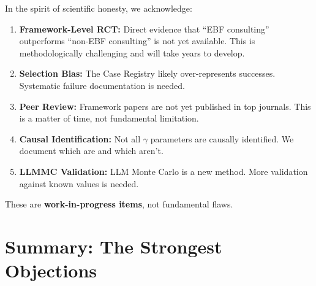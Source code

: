 \begin{tcolorbox}[colback=yellow!5!white, colframe=yellow!75!black,
    title=What We Acknowledge]

In the spirit of scientific honesty, we acknowledge:

\begin{enumerate}
    \item \textbf{Framework-Level RCT:} Direct evidence that ``EBF consulting'' outperforms
    ``non-EBF consulting'' is not yet available. This is methodologically challenging
    and will take years to develop.

    \item \textbf{Selection Bias:} The Case Registry likely over-represents successes.
    Systematic failure documentation is needed.

    \item \textbf{Peer Review:} Framework papers are not yet published in top journals.
    This is a matter of time, not fundamental limitation.

    \item \textbf{Causal Identification:} Not all $\gamma$ parameters are causally identified.
    We document which are and which aren't.

    \item \textbf{LLMMC Validation:} LLM Monte Carlo is a new method. More validation
    against known values is needed.
\end{enumerate}

These are \textbf{work-in-progress items}, not fundamental flaws.

\end{tcolorbox}

\section{Summary: The Strongest Objections}
\label{sec:da-summary}

